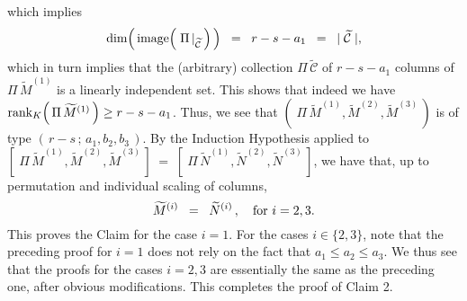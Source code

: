 which implies
\begin{equation*}
\dim\!\left(\,\textnormal{image}\!\left(\,\left.\Pi\,\right\vert_{\widetilde{\mathcal{C}}}\,\right)\,\right)
\;\; = \;\; r - s - a_{1}
\;\; = \;\; \vert\;\widetilde{\mathcal{C}}\;\vert,
\end{equation*}
which in turn implies that the (arbitrary) collection $\Pi\,\widetilde{\mathcal{C}}$ of $r - s - a_{1}$ columns of
$\Pi\,\widetilde{M}^{(1)}$ is a linearly independent set.
This shows that indeed we have $\textnormal{rank}_{K}\!\left(\,\Pi\,\widetilde{M}^{(1)}\,\right) \geq r - s - a_{1}$.
Thus, we see that $\left(\;\Pi\,\widetilde{M}^{(1)},\widetilde{M}^{(2)},\widetilde{M}^{(3)}\,\right)$
is of type $\left(\,r-s\,;\,a_{1},b_{2},b_{3}\,\right)$.
By the Induction Hypothesis applied to
$\left[\;\Pi\,\widetilde{M}^{(1)},\widetilde{M}^{(2)},\widetilde{M}^{(3)}\,\right]
\; = \; \left[\;\Pi\,\widetilde{N}^{(1)},\widetilde{N}^{(2)},\widetilde{N}^{(3)}\,\right]$,
we have that, up to permutation and individual scaling of columns,
\begin{equation*}
\widetilde{M}^{(i)} \;\; = \;\; \widetilde{N}^{(i)}\,,
\quad\textnormal{for $i = 2,3$}.
\end{equation*}
This proves the Claim for the case $i = 1$.
For the cases $i \in \{2,3\}$, note that the preceding proof for $i = 1$ does not rely
on the fact that $a_{1} \leq a_{2} \leq a_{3}$.
We thus see that the proofs for the cases $i = 2,3$
are essentially the same as the preceding one, after obvious modifications.
This completes the proof of Claim 2.


